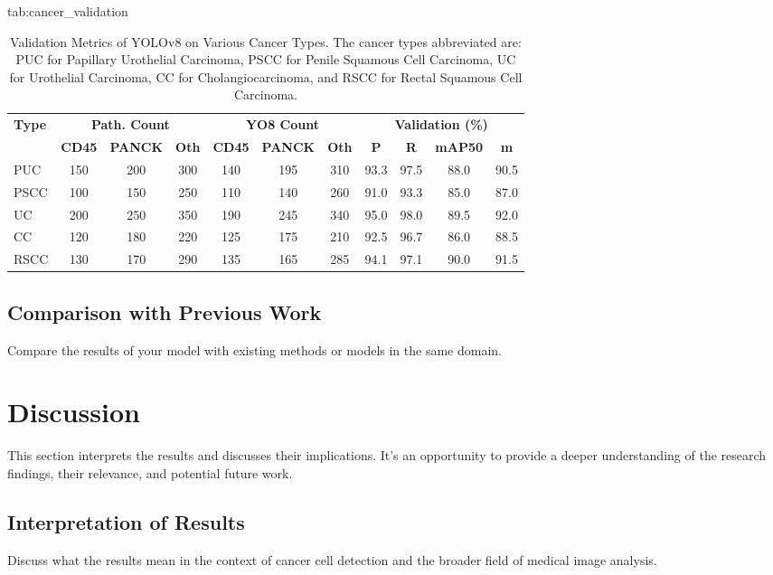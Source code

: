 \documentclass[anon]{midl} %
\begin{document}
\begin{table}[htbp]
\floatconts
  {tab:cancer_validation}%
  {\caption{Validation Metrics of YOLOv8 on Various Cancer Types. The cancer types abbreviated are: PUC for Papillary Urothelial Carcinoma, PSCC for Penile Squamous Cell Carcinoma, UC for Urothelial Carcinoma, CC for Cholangiocarcinoma, and RSCC for Rectal Squamous Cell Carcinoma.}}%
  {\begin{tabular}{l|ccc|ccc|cccc}
  \bfseries Type & \multicolumn{3}{c|}{\bfseries Path. Count} & \multicolumn{3}{c|}{\bfseries YO8 Count} & \multicolumn{4}{c}{\bfseries Validation (\%)}\\
  & \bfseries CD45 & \bfseries PANCK & \bfseries Oth & \bfseries CD45 & \bfseries PANCK & \bfseries Oth & \bfseries P & \bfseries R & \bfseries mAP50 & \bfseries m\\
  PUC & 150 & 200 & 300 & 140 & 195 & 310 & 93.3 & 97.5 & 88.0 & 90.5\\
  PSCC & 100 & 150 & 250 & 110 & 140 & 260 & 91.0 & 93.3 & 85.0 & 87.0\\
  UC & 200 & 250 & 350 & 190 & 245 & 340 & 95.0 & 98.0 & 89.5 & 92.0\\
  CC & 120 & 180 & 220 & 125 & 175 & 210 & 92.5 & 96.7 & 86.0 & 88.5\\
  RSCC & 130 & 170 & 290 & 135 & 165 & 285 & 94.1 & 97.1 & 90.0 & 91.5
  \end{tabular}}
\end{table}





\subsection{Comparison with Previous Work}
Compare the results of your model with existing methods or models in the same domain.

\section{Discussion}

This section interprets the results and discusses their implications. It's an opportunity to provide a deeper understanding of the research findings, their relevance, and potential future work.

\subsection{Interpretation of Results}
Discuss what the results mean in the context of cancer cell detection and the broader field of medical image analysis.
\end{document}
